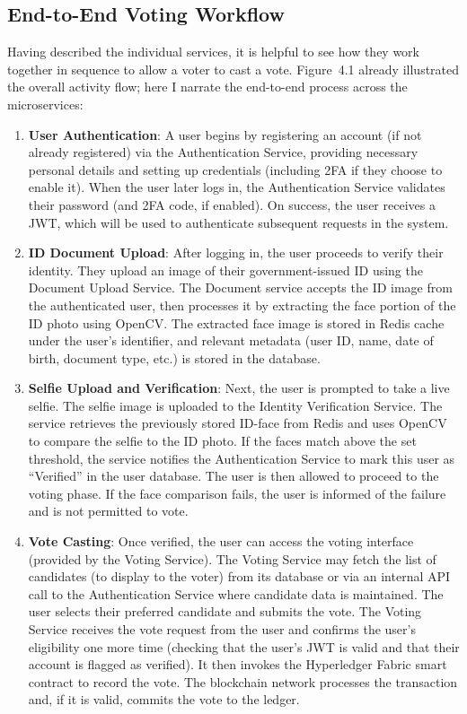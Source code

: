 \documentclass[a4paper,10pt]{report}
\begin{document}
\subsection{End-to-End Voting Workflow}
Having described the individual services, it is helpful to see how they work together in sequence to allow a voter to cast a vote. Figure~4.1 already illustrated the overall activity flow; here I narrate the end-to-end process across the microservices:
\begin{enumerate}
    \item \textbf{User Authentication}: A user begins by registering an account (if not already registered) via the Authentication Service, providing necessary personal details and setting up credentials (including 2FA if they choose to enable it). When the user later logs in, the Authentication Service validates their password (and 2FA code, if enabled). On success, the user receives a JWT, which will be used to authenticate subsequent requests in the system.
    \item \textbf{ID Document Upload}: After logging in, the user proceeds to verify their identity. They upload an image of their government-issued ID using the Document Upload Service. The Document service accepts the ID image from the authenticated user, then processes it by extracting the face portion of the ID photo using OpenCV. The extracted face image is stored in Redis cache under the user’s identifier, and relevant metadata (user ID, name, date of birth, document type, etc.) is stored in the database. 
    \item \textbf{Selfie Upload and Verification}: Next, the user is prompted to take a live selfie. The selfie image is uploaded to the Identity Verification Service. The service retrieves the previously stored ID-face from Redis and uses OpenCV to compare the selfie to the ID photo. If the faces match above the set threshold, the service notifies the Authentication Service to mark this user as “Verified” in the user database. The user is then allowed to proceed to the voting phase. If the face comparison fails, the user is informed of the failure and is not permitted to vote.
    \item \textbf{Vote Casting}: Once verified, the user can access the voting interface (provided by the Voting Service). The Voting Service may fetch the list of candidates (to display to the voter) from its database or via an internal API call to the Authentication Service where candidate data is maintained. The user selects their preferred candidate and submits the vote. The Voting Service receives the vote request from the user and confirms the user’s eligibility one more time (checking that the user’s JWT is valid and that their account is flagged as verified). It then invokes the Hyperledger Fabric smart contract to record the vote. The blockchain network processes the transaction and, if it is valid, commits the vote to the ledger.

\end{enumerate}
\end{document}
